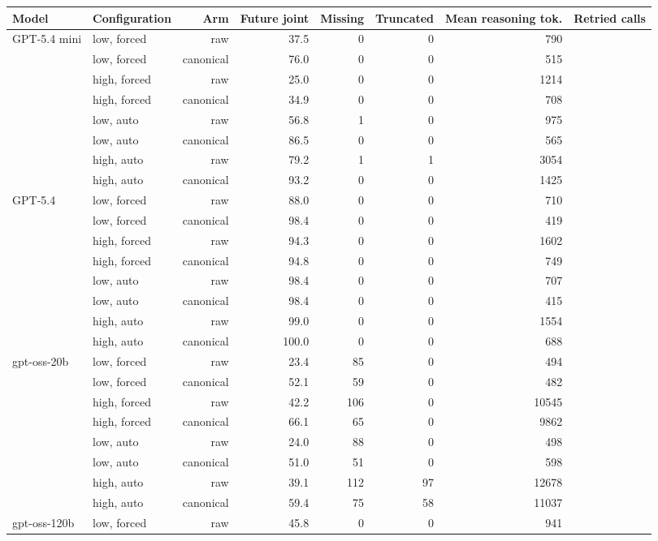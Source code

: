 \begin{table}[htbp]
\centering\scriptsize
\setlength{\tabcolsep}{3pt}
\begin{tabular}{llrrrrrr}
\toprule
Model & Configuration & Arm & Future joint & Missing & Truncated & Mean reasoning tok. & Retried calls \\
\midrule
GPT-5.4 mini & low, forced & raw & 37.5 & 0 & 0 & 790 &  \\
 & low, forced & canonical & 76.0 & 0 & 0 & 515 &  \\
 & high, forced & raw & 25.0 & 0 & 0 & 1214 &  \\
 & high, forced & canonical & 34.9 & 0 & 0 & 708 &  \\
 & low, auto & raw & 56.8 & 1 & 0 & 975 &  \\
 & low, auto & canonical & 86.5 & 0 & 0 & 565 &  \\
 & high, auto & raw & 79.2 & 1 & 1 & 3054 &  \\
 & high, auto & canonical & 93.2 & 0 & 0 & 1425 &  \\
\midrule
GPT-5.4 & low, forced & raw & 88.0 & 0 & 0 & 710 &  \\
 & low, forced & canonical & 98.4 & 0 & 0 & 419 &  \\
 & high, forced & raw & 94.3 & 0 & 0 & 1602 &  \\
 & high, forced & canonical & 94.8 & 0 & 0 & 749 &  \\
 & low, auto & raw & 98.4 & 0 & 0 & 707 &  \\
 & low, auto & canonical & 98.4 & 0 & 0 & 415 &  \\
 & high, auto & raw & 99.0 & 0 & 0 & 1554 &  \\
 & high, auto & canonical & 100.0 & 0 & 0 & 688 &  \\
\midrule
gpt-oss-20b & low, forced & raw & 23.4 & 85 & 0 & 494 &  \\
 & low, forced & canonical & 52.1 & 59 & 0 & 482 &  \\
 & high, forced & raw & 42.2 & 106 & 0 & 10545 &  \\
 & high, forced & canonical & 66.1 & 65 & 0 & 9862 &  \\
 & low, auto & raw & 24.0 & 88 & 0 & 498 &  \\
 & low, auto & canonical & 51.0 & 51 & 0 & 598 &  \\
 & high, auto & raw & 39.1 & 112 & 97 & 12678 &  \\
 & high, auto & canonical & 59.4 & 75 & 58 & 11037 &  \\
\midrule
gpt-oss-120b & low, forced & raw & 45.8 & 0 & 0 & 941 &  \\

\end{tabular}
\end{table}
